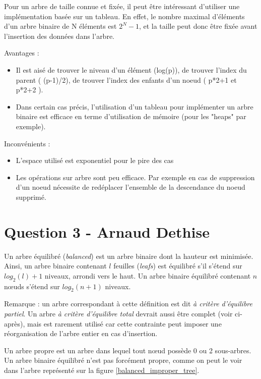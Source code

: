 \documentclass[10pt,a4paper]{article}
\begin{document}
Pour un arbre de taille connue et fixée, il peut être intéressant d'utiliser une implémentation basée sur un tableau. En effet, le nombre maximal d'éléments d'un arbre binaire de N éléments est $2^N-1$, et la taille peut donc être fixée avant l'insertion des données dans l'arbre.

Avantages :
\begin{itemize}
\item Il est aisé de trouver le niveau d'un élément (log(p)), de trouver l'index du parent ( (p-1)/2), de trouver l'index des enfants d'un noeud ( p*2+1 et p*2+2 ).
\item Dans certain cas précis, l'utilisation d'un tableau pour implémenter un arbre binaire est efficace en terme d'utilisation de mémoire (pour les "heaps" par exemple).
\end{itemize}
Inconvénients :
\begin{itemize}
\item L'espace utilisé est exponentiel pour le pire des cas 
\item Les opérations sur arbre sont peu efficace. Par exemple en cas de suppression d'un noeud nécessite de redéplacer l'ensemble de la descendance du noeud supprimé.
\end{itemize}

\section*{Question 3 - Arnaud Dethise}

	Un arbre équilibré (\textit{balanced}) est un arbre binaire dont la hauteur est minimisée. Ainsi, un arbre binaire contenant $l$ feuilles (\textit{leafs}) est équilibré s'il s'étend sur $log_{2}(l)+1$ niveaux, arrondi vers le haut.
	Un arbre binaire équilibré contenant $n$ nœuds s'étend sur $log_{2}(n+1)$ niveaux.
	
	Remarque : un arbre correspondant à cette définition est dit \textit{à critère d'équilibre partiel}. Un arbre \textit{à critère d'équilibre total} devrait aussi être complet (voir ci-après), mais est rarement utilisé car cette contrainte peut imposer une réorganisation de l'arbre entier en cas d'insertion.
	
	Un arbre propre est un arbre dans lequel tout nœud possède 0 ou 2 sous-arbres.
	Un arbre binaire équilibré n'est pas forcément propre, comme on peut le voir dans l'arbre représenté sur la figure \ref{balanced_improper_tree}.
	
\end{document}

